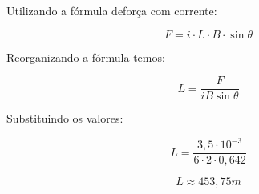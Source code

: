 \item
Utilizando a fórmula deforça com corrente:

$$
F = i \cdot L \cdot B \cdot \sin \theta
$$

Reorganizando a fórmula temos:

$$
L = \frac{F}{i B \sin \theta}
$$

Substituindo os valores:

$$
L = \frac{3,5 \cdot 10^{-3}}{6 \cdot 2 \cdot 0,642}
$$

$$
L \approx 453,75m
$$